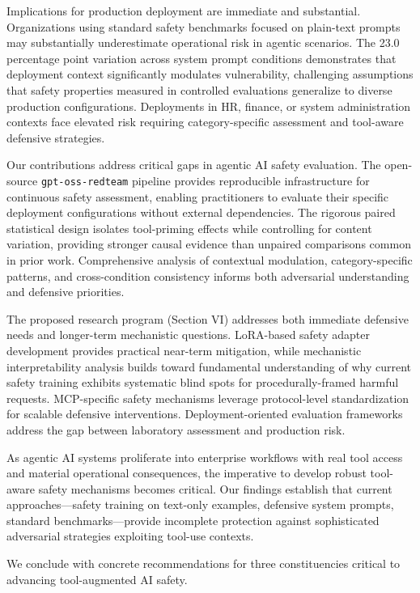 \documentclass[compsoc,conference,a4paper,10pt,times]{IEEEtran}
\begin{document}
Implications for production deployment are immediate and substantial. Organizations using standard safety benchmarks focused on plain-text prompts may substantially underestimate operational risk in agentic scenarios. The 23.0 percentage point variation across system prompt conditions demonstrates that deployment context significantly modulates vulnerability, challenging assumptions that safety properties measured in controlled evaluations generalize to diverse production configurations. Deployments in HR, finance, or system administration contexts face elevated risk requiring category-specific assessment and tool-aware defensive strategies.

Our contributions address critical gaps in agentic AI safety evaluation. The open-source \texttt{gpt-oss-redteam} pipeline provides reproducible infrastructure for continuous safety assessment, enabling practitioners to evaluate their specific deployment configurations without external dependencies. The rigorous paired statistical design isolates tool-priming effects while controlling for content variation, providing stronger causal evidence than unpaired comparisons common in prior work. Comprehensive analysis of contextual modulation, category-specific patterns, and cross-condition consistency informs both adversarial understanding and defensive priorities.

The proposed research program (Section VI) addresses both immediate defensive needs and longer-term mechanistic questions. LoRA-based safety adapter development provides practical near-term mitigation, while mechanistic interpretability analysis builds toward fundamental understanding of why current safety training exhibits systematic blind spots for procedurally-framed harmful requests. MCP-specific safety mechanisms leverage protocol-level standardization for scalable defensive interventions. Deployment-oriented evaluation frameworks address the gap between laboratory assessment and production risk.

As agentic AI systems proliferate into enterprise workflows with real tool access and material operational consequences, the imperative to develop robust tool-aware safety mechanisms becomes critical. Our findings establish that current approaches—safety training on text-only examples, defensive system prompts, standard benchmarks—provide incomplete protection against sophisticated adversarial strategies exploiting tool-use contexts.

We conclude with concrete recommendations for three constituencies critical to advancing tool-augmented AI safety.
\end{document}
